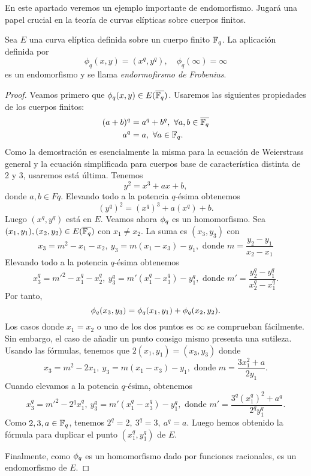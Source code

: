 En este apartado veremos un ejemplo importante de endomorfismo. Jugará una papel crucial en la teoría de curvas elípticas sobre cuerpos finitos.

\begin{proposicion}
	Sea $E$ una curva elíptica definida sobre un cuerpo finito $\mathbb{F}_q$. La aplicación definida por
	$$
		\phi_q(x, y) = (x^q, y^q), \quad \phi_q(\infty) = \infty
	$$
	es un endomorfismo y se llama \emph{endormofirsmo de Frobenius}.
\end{proposicion}
\begin{proof}
Veamos primero que $\phi_q(x, y) \in E(\overline{\mathbb{F}_q})$. Usaremos las siguientes propiedades de los cuerpos finitos:
\begin{align*}
	(a + b)^q &= a^q + b^q, \ \forall a, b \in \overline{\mathbb{F}_q} \\
	a^q &= a, \ \forall a \in \mathbb{F}_q.
\end{align*}
Como la demostración es esencialmente la misma para la ecuación de Weierstrass general y la ecuación simplificada para cuerpos base de característica distinta de 2 y 3, usaremos está última. Tenemos
$$
	y^2 = x^3 + a x + b,
$$
donde $a, b \in Fq$. Elevando todo a la potencia $q$-ésima obtenemos
$$
	(y^q)^2 = (x^q)^3 + a (x^q) + b.
$$
Luego $(x^q, y^q)$ está en $E$. Veamos ahora $\phi_q$ es un homomorfismo. Sea $(x_1, y_1), (x_2, y_2) \in E(\overline{\mathbb{F}_q})$ con $x_1 \neq x_2$. La suma es $(x_3, y_3)$ con
$$
	x_3 = m^2 - x_1 - x_2, \ y_3 = m (x_1 - x_3) - y_1, \textrm{ donde } m = \frac{y_2 - y_1}{x_2 - x_1}
$$
Elevando todo a la potencia $q$-ésima obtenemos
$$
	x_3^q = m'^2 - x_1^q - x_2^q, \ y_3^q = m' (x_1^q - x_3^q) - y_1^q, \textrm{ donde } m' = \frac{y_2^q - y_1^q}{x_2^q - x_1^q}.
$$
Por tanto,
$$
	\phi_q(x_3, y_3) = \phi_q(x_1, y_1) + \phi_q(x_2, y_2).
$$
Los casos donde $x_1 = x_2$ o uno de los dos puntos es $\infty$ se comprueban fácilmente. Sin embargo, el caso de añadir un punto consigo mismo presenta una sutileza. Usando las fórmulas, tenemos que $2 (x_1, y_1) = (x_3, y_3)$ donde
$$
	x_3 = m^2 - 2 x_1, \ y_3 = m (x_1 - x_3) - y_1, \textrm{ donde } m = \frac{3 x_1^2 + a}{2 y_1}.
$$
Cuando elevamos a la potencia $q$-ésima, obtenemos
$$
	x_3^q = m'^2 - 2^q x_1^q, \ y_3^q = m' (x_1^q - x_3^q) - y_1^q, \textrm{ donde } m' = \frac{3^q (x_1^q)^2 + a^q}{2^q y_1^q}.
$$
Como $2, 3, a \in \mathbb{F}_q$, tenemos $2^q = 2,\ 3^q = 3,\ a^q = a$. Luego hemos obtenido la fórmula para duplicar el punto $(x_1^q, y_1^q)$ de $E$.

Finalmente, como $\phi_q$ es un homomorfismo dado por funciones racionales, es un endomorfismo de $E$.
\end{proof}

